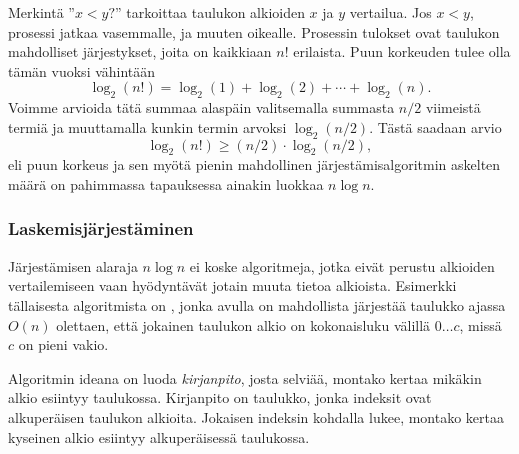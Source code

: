 Merkintä ''$x<y?$'' tarkoittaa taulukon alkioiden
$x$ ja $y$ vertailua.
Jos $x<y$, prosessi jatkaa vasemmalle,
ja muuten oikealle.
Prosessin tulokset ovat taulukon mahdolliset
järjestykset, joita on kaikkiaan $n!$ erilaista.
Puun korkeuden tulee olla tämän vuoksi vähintään
\[ \log_2(n!) = \log_2(1)+\log_2(2)+\cdots+\log_2(n).\]
Voimme arvioida tätä summaa alaspäin
valitsemalla summasta $n/2$
viimeistä termiä ja muuttamalla kunkin
termin arvoksi $\log_2(n/2)$.
Tästä saadaan arvio
\[ \log_2(n!) \ge (n/2) \cdot \log_2(n/2),\]
eli puun korkeus ja sen myötä
pienin mahdollinen järjestämisalgoritmin askelten
määrä on pahimmassa tapauksessa ainakin luokkaa $n \log n$.

\subsubsection{Laskemisjärjestäminen}


Järjestämisen alaraja $n \log n$ ei koske algoritmeja,
jotka eivät perustu alkioiden vertailemiseen
vaan hyödyntävät jotain muuta tietoa alkioista.
Esimerkki tällaisesta algoritmista on
, jonka avulla
on mahdollista järjestää
taulukko ajassa $O(n)$ olettaen,
että jokainen taulukon alkio on
kokonaisluku välillä $0 \ldots c$,
missä $c$ on pieni vakio.

Algoritmin ideana on luoda \emph{kirjanpito}, josta selviää,
montako kertaa mikäkin alkio esiintyy taulukossa.
Kirjanpito on taulukko, jonka indeksit ovat alkuperäisen
taulukon alkioita.
Jokaisen indeksin kohdalla lukee, montako kertaa
kyseinen alkio esiintyy alkuperäisessä taulukossa.

